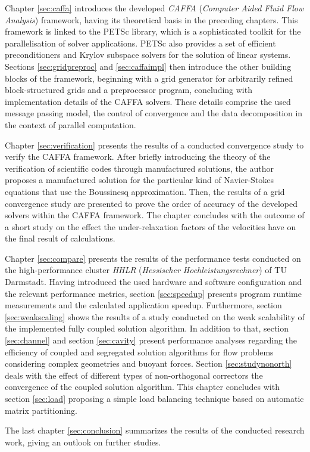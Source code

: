 Chapter \ref{sec:caffa} introduces the developed \emph{CAFFA} (\emph{Computer Aided Fluid Flow Analysis}) framework, having its theoretical basis in the preceding chapters. This framework is linked to the PETSc library, which is a sophisticated toolkit for the parallelisation of solver applications. PETSc also provides a set of efficient preconditioners and Krylov subspace solvers for the solution of linear systems. Sections \ref{sec:gridpreproc} and \ref{sec:caffaimpl} then introduce the other building blocks of the framework, beginning with a grid generator for arbitrarily refined block-structured grids and a preprocessor program, concluding with implementation details of the CAFFA solvers. These details comprise the used message passing model, the control of convergence and the data decomposition in the context of parallel computation.

Chapter \ref{sec:verification} presents the results of a conducted convergence study to verify the CAFFA framework. After briefly introducing the theory of the verification of scientific codes through manufactured solutions, the author proposes a manufactured solution for the particular kind of Navier-Stokes equations that use the Boussinesq approximation. Then, the results of a grid convergence study are presented to prove the order of accuracy of the developed solvers within the CAFFA framework. The chapter concludes with the outcome of a short study on the effect the under-relaxation factors of the velocities have on the final result of calculations.

Chapter \ref{sec:compare} presents the results of the performance tests conducted on the high-performance cluster \emph{HHLR} (\emph{Hessischer Hochleistungsrechner}) of TU Darmstadt. Having introduced the used hardware and software configuration and the relevant performance metrics, section \ref{sec:speedup} presents program runtime measurements and the calculated application speedup. Furthermore, section \ref{sec:weakscaling} shows the results of a study conducted on the weak scalability of the implemented fully coupled solution algorithm. In addition to that, section \ref{sec:channel} and section \ref{sec:cavity} present performance analyses regarding the efficiency of coupled and segregated solution algorithms for flow problems considering complex geometries and buoyant forces. Section \ref{sec:studynonorth} deals with the effect of different types of non-orthogonal correctors the convergence of the coupled solution algorithm. This chapter concludes with section \ref{sec:load} proposing a simple load balancing technique based on automatic matrix partitioning.

The last chapter \ref{sec:conclusion} summarizes the results of the conducted research work, giving an outlook on further studies.

